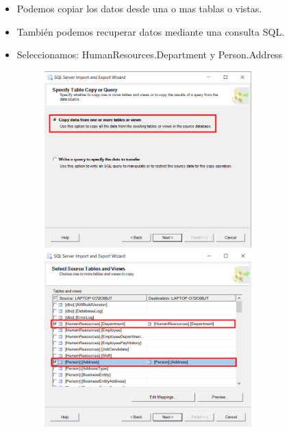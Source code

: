 \documentclass{article}
\begin{document}
\begin{itemize}
\item Podemos copiar los datos desde una o mas tablas o vistas. 
\item También podemos recuperar datos mediante una consulta SQL.
\item Seleccionamos: HumanResources.Department y Person.Address
	\begin{figure}[htb]
		\begin{center}
			\includegraphics[width=8cm]{./images/Tarea1_5}
			\includegraphics[width=8cm]{./images/Tarea1_6}
		\end{center}
	\end{figure}

\newpage


\end{itemize}
\end{document}
